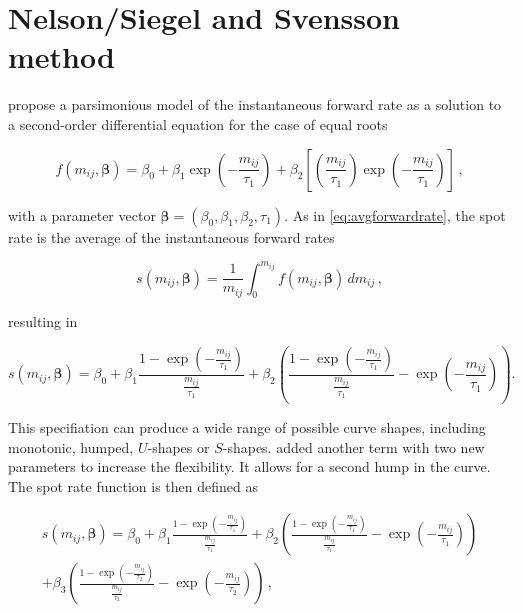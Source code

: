 \newpage
\section{Nelson/Siegel and Svensson method}
\label{sec:nels-svenss-meth}

\cite{Nelson1987} propose a parsimonious  model of  the instantaneous forward rate as a solution to a second-order differential equation for the case of equal roots

\begin{equation}
  \label{eq:laguerre}
  f(m_{ij},\bm{\beta}) = \beta_0+\beta_1\exp\left(-\frac{m_{ij}}{\tau_1}\right)+\beta_2\left[\left(\frac{m_{ij}}{\tau_1}\right)\exp\left(-\frac{m_{ij}}{\tau_1}\right)\right]\,,
\end{equation}

with a parameter vector ${\bm{\beta}} = \left(\beta_0,\beta_1,\beta_2,\tau_1\right)$. As in \eqref{eq:avgforwardrate}, the spot rate is the average of the instantaneous forward rates

\begin{equation*}
  \label{eq:intspotrate}
  s(m_{ij},\bm{\beta})=\frac{1}{m_{ij}}\int_0^{m_{ij}}f(m_{ij},\bm{\beta})\,dm_{ij}\,,
\end{equation*}

resulting in

\begin{equation}
  \label{eq:nelson-spot}
   s(m_{ij},\bm{\beta}) = \beta_0 + \beta_1\frac{1-\exp(-\frac{m_{ij}}{\tau_1})}{\frac{m_{ij}}{\tau_1}} + \beta_2\left(\frac{1-\exp(-\frac{m_{ij}}{\tau_1})}{\frac{m_{ij}}{\tau_1}} - \exp(-\frac{m_{ij}}{\tau_1})\right).
\end{equation}

 
This specifiation can produce a wide range of possible curve shapes, including monotonic, humped, $U$-shapes or $S$-shapes. \cite{Svensson1994} added another term with two new parameters to increase the flexibility. It allows for a second hump in the curve. The spot rate function is then defined as


\begin{multline}\label{eq:svensson-spot}
    s(m_{ij},\bm{\beta}) = \beta_0 + \beta_1\frac{1-\exp(-\frac{m_{ij}}{\tau_1})}{\frac{m_{ij}}{\tau_1}} + \beta_2\left(\frac{1-\exp(-\frac{m_{ij}}{\tau_1})}{\frac{m_{ij}}{\tau_1}} - \exp(-\frac{m_{ij}}{\tau_1})\right) \\+ \beta_3\left(\frac{1-\exp(-\frac{m_{ij}}{\tau_2})}{\frac{m_{ij}}{\tau_2}} - \exp(-\frac{m_{ij}}{\tau_2})\right)\,,
\end{multline}



